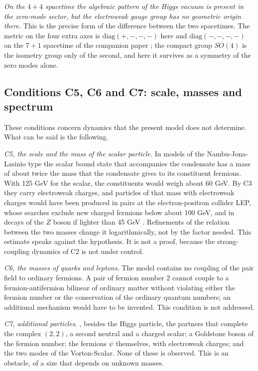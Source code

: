 \emph{On the $4+4$ spacetime the algebraic pattern of the Higgs vacuum is present in the zero-mode
sector, but the electroweak gauge group has no geometric origin there.} This is the precise form of
the difference between the two spacetimes. The metric on the four extra axes is
$\mathrm{diag}(+,-,-,-)$ here and $\mathrm{diag}(-,-,-,-)$ on the $7+1$ spacetime of the companion
paper \cite{Companion1671}; the compact group $SO(4)$ is the isometry group only of the second, and
here it survives as a symmetry of the zero modes alone.

\subsection{Conditions C5, C6 and C7: scale, masses and spectrum}

These conditions concern dynamics that the present model does not determine. What can be said is the
following.

\emph{C5, the scale and the mass of the scalar particle.} In models of the Nambu-Jona-Lasinio type
the scalar bound state that accompanies the condensate has a mass of about twice the mass that the
condensate gives to its constituent fermions. With 125 GeV for the scalar, the constituents would
weigh about 60 GeV. By C3 they carry electroweak charges, and particles of that mass with electroweak
charges would have been produced in pairs at the electron-positron collider LEP, whose searches
exclude new charged fermions below about 100 GeV, and in decays of the $Z$ boson if lighter than
45 GeV \cite{PDG2024}. Refinements of the relation between the two masses
\cite{BardeenHillLindner1990} change it logarithmically, not by the factor needed. This estimate
speaks against the hypothesis. It is not a proof, because the strong-coupling dynamics of C2 is not
under control.

\emph{C6, the masses of quarks and leptons.} The model contains no coupling of the pair field to
ordinary fermions. A pair of fermion number 2 cannot couple to a fermion-antifermion bilinear of
ordinary matter without violating either the fermion number or the conservation of the ordinary
quantum numbers; an additional mechanism would have to be invented. This condition is not addressed.

\emph{C7, additional particles.} , besides the Higgs particle, the partners that complete the complex
$(2,2)$, a second neutral and a charged scalar; a Goldstone boson of the fermion number; the fermions
$\psi$ themselves, with electroweak charges; and the two modes of the Vorton-Scalar. None of these is
observed. This is an obstacle, of a size that depends on unknown masses.

